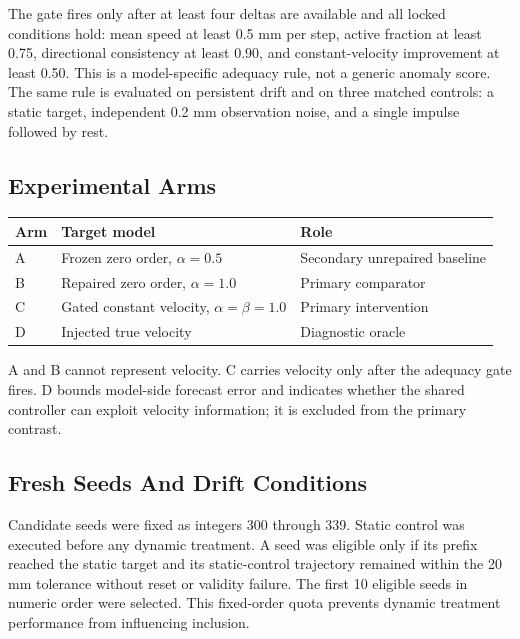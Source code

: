 \documentclass[10pt]{article}
\begin{document}
The gate fires only after at least four deltas are available and all locked conditions hold: mean speed at least 0.5 mm per step, active fraction at least 0.75, directional consistency at least 0.90, and constant-velocity improvement at least 0.50. This is a model-specific adequacy rule, not a generic anomaly score. The same rule is evaluated on persistent drift and on three matched controls: a static target, independent 0.2 mm observation noise, and a single impulse followed by rest.

\subsection{Experimental Arms}

\begin{table}[htbp]
\centering
\small
\begin{tabularx}{\textwidth}{@{}>{\raggedright\arraybackslash}X >{\raggedright\arraybackslash}X >{\raggedright\arraybackslash}X@{}}
\toprule
Arm & Target model & Role \\
\midrule
A & Frozen zero order, \(\alpha=0.5\) & Secondary unrepaired baseline \\
B & Repaired zero order, \(\alpha=1.0\) & Primary comparator \\
C & Gated constant velocity, \(\alpha=\beta=1.0\) & Primary intervention \\
D & Injected true velocity & Diagnostic oracle \\
\bottomrule
\end{tabularx}
\end{table}

A and B cannot represent velocity. C carries velocity only after the adequacy gate fires. D bounds model-side forecast error and indicates whether the shared controller can exploit velocity information; it is excluded from the primary contrast.

\subsection{Fresh Seeds And Drift Conditions}

Candidate seeds were fixed as integers 300 through 339. Static control was executed before any dynamic treatment. A seed was eligible only if its prefix reached the static target and its static-control trajectory remained within the 20 mm tolerance without reset or validity failure. The first 10 eligible seeds in numeric order were selected. This fixed-order quota prevents dynamic treatment performance from influencing inclusion.
\end{document}
